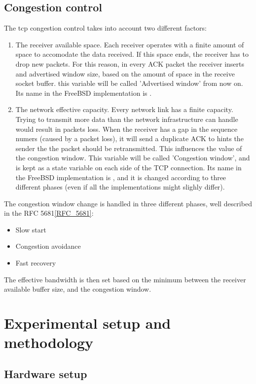 \documentclass[a4paper,10pt]{article}
\begin{document}
\subsection{Congestion control}
The tcp congestion control takes into account two different factors: 
\begin{enumerate}
   \item The receiver available space. Each receiver operates with a finite
      amount of space to accomodate the data received. If this space ends, the
      receiver has to drop new packets. For this reason, in every ACK packet
      the receiver inserts and advertised window size, based on the amount of
      space in the receive socket buffer. this variable will be called
      'Advertised window' from now on. Its name in the FreeBSD implementation
      is .  
   \item The network effective capacity. Every network link has a finite
      capacity. Trying to transmit more data than the network infrastructure
      can handle would result in packets loss. When the receiver has a gap in
      the sequence numers (caused by a packet loss), it will send a duplicate
      ACK to hints the sender the the packet should be retransmitted. This
      influences the value of the congestion window.  This variable will be
      called 'Congestion window', and is kept as a state variable on each side
      of the TCP connection. Its name in the FreeBSD implementation is
      , and it is changed according to three different
      phases (even if all the implementations might slighly differ).
\end{enumerate}
The congestion window change is handled in three different phases, well described in the RFC 5681\ref{RFC_5681}:
\begin{itemize}
   \item Slow start
   \item Congestion avoidance
   \item Fast recovery
\end{itemize}
The effective bandwidth is then set based on the minimum between the receiver available buffer size, and the congestion window.

\section{Experimental setup and methodology}

\subsection{Hardware setup}
\end{document}

